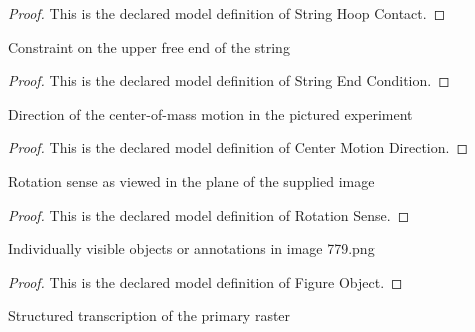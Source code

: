 \begin{proof}
  This is the declared model definition of String Hoop Contact.
\end{proof}
\begin{definition}
  \label{def:physics:phyx-mini-0779:phyxminiproblems-problemphyxmini0779-stringendcondition}
  Constraint on the upper free end of the string
\end{definition}
\begin{proof}
  This is the declared model definition of String End Condition.
\end{proof}
\begin{definition}
  \label{def:physics:phyx-mini-0779:phyxminiproblems-problemphyxmini0779-centermotiondirection}
  Direction of the center-of-mass motion in the pictured experiment
\end{definition}
\begin{proof}
  This is the declared model definition of Center Motion Direction.
\end{proof}
\begin{definition}
  \label{def:physics:phyx-mini-0779:phyxminiproblems-problemphyxmini0779-rotationsense}
  Rotation sense as viewed in the plane of the supplied image
\end{definition}
\begin{proof}
  This is the declared model definition of Rotation Sense.
\end{proof}
\begin{definition}
  \label{def:physics:phyx-mini-0779:phyxminiproblems-problemphyxmini0779-figureobject}
  Individually visible objects or annotations in image 779.png
\end{definition}
\begin{proof}
  This is the declared model definition of Figure Object.
\end{proof}
\begin{definition}
  \label{def:physics:phyx-mini-0779:phyxminiproblems-problemphyxmini0779-suppliedhoopfigure}
  Structured transcription of the primary raster
\end{definition}
